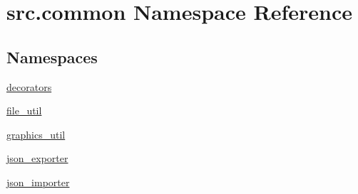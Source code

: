 \hypertarget{namespacesrc_1_1common}{}\section{src.\+common Namespace Reference}
\label{namespacesrc_1_1common}
\subsection*{Namespaces}
\begin{DoxyCompactItemize}
\item 
 \hyperlink{namespacesrc_1_1common_1_1decorators}{decorators}
\item 
 \hyperlink{namespacesrc_1_1common_1_1file__util}{file\+\_\+util}
\item 
 \hyperlink{namespacesrc_1_1common_1_1graphics__util}{graphics\+\_\+util}
\item 
 \hyperlink{namespacesrc_1_1common_1_1json__exporter}{json\+\_\+exporter}
\item 
 \hyperlink{namespacesrc_1_1common_1_1json__importer}{json\+\_\+importer}
\end{DoxyCompactItemize}
